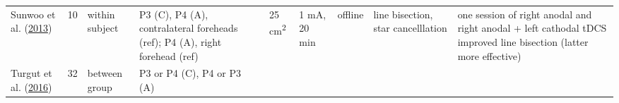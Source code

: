 \documentclass[11pt,]{memoir}
\begin{document}
\begin{longtable}[]{@{}lllllllll@{}}
\begin{minipage}[t]{0.09\columnwidth}
Sunwoo et al. (\protect\hyperlink{ref-Sunwoo2013}{2013})\strut
\end{minipage} & \begin{minipage}[t]{0.02\columnwidth}\raggedright
10\strut
\end{minipage} & \begin{minipage}[t]{0.04\columnwidth}\raggedright
within
subject\strut
\end{minipage} & \begin{minipage}[t]{0.10\columnwidth}\raggedright
P3 (C), P4 (A),
contralateral foreheads
(ref); P4 (A), right
forehead (ref)\strut
\end{minipage} & \begin{minipage}[t]{0.03\columnwidth}\raggedright
25
cm\textsuperscript{2}\strut
\end{minipage} & \begin{minipage}[t]{0.05\columnwidth}\raggedright
1 mA, 20
min\strut
\end{minipage} & \begin{minipage}[t]{0.04\columnwidth}\raggedright
offline\strut
\end{minipage} & \begin{minipage}[t]{0.15\columnwidth}\raggedright
line bisection, star cancelllation\strut
\end{minipage} & \begin{minipage}[t]{0.24\columnwidth}\raggedright
one session of right anodal and right anodal + left cathodal
tDCS improved line bisection (latter more effective)\strut
\end{minipage}\tabularnewline
\begin{minipage}[t]{0.09\columnwidth}\raggedright
Turgut et al. (\protect\hyperlink{ref-Turgut2016}{2016})\strut
\end{minipage} & \begin{minipage}[t]{0.02\columnwidth}\raggedright
32\strut
\end{minipage} & \begin{minipage}[t]{0.04\columnwidth}\raggedright
between
group\strut
\end{minipage} & \begin{minipage}[t]{0.10\columnwidth}\raggedright
P3 or P4 (C), P4 or P3
(A)\strut
\end{minipage} & \begin{minipage}[t]{0.03\columnwidth}\raggedright
\strut
\end{minipage} & \begin{minipage}[t]{0.05\columnwidth}\raggedright

\end{minipage}
\end{longtable}
\end{document}
